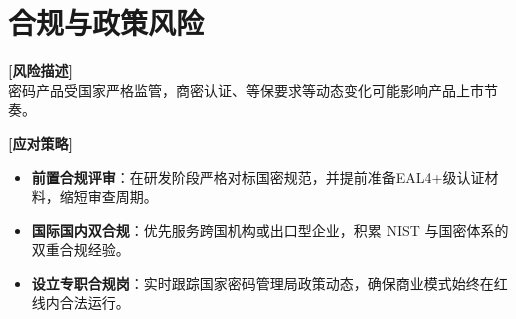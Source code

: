 \section{合规与政策风险}

\textbf{[风险描述]} \\
密码产品受国家严格监管，商密认证、等保要求等动态变化可能影响产品上市节奏。

\textbf{[应对策略]}
\begin{itemize}
	\item \textbf{前置合规评审}：在研发阶段严格对标国密规范，并提前准备EAL4+级认证材料，缩短审查周期。
	\item \textbf{国际国内双合规}：优先服务跨国机构或出口型企业，积累 NIST 与国密体系的双重合规经验。
	\item \textbf{设立专职合规岗}：实时跟踪国家密码管理局政策动态，确保商业模式始终在红线内合法运行。
\end{itemize}